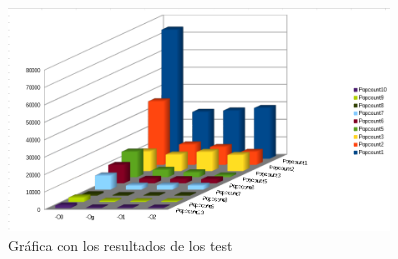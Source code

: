 	\begin{figure}[htb]
		\centering
		\includegraphics[width=0.9\textwidth]{./imagenes/3}
		\caption{Gráfica con los resultados de los test} \label{fig:33}
	\end{figure}
	

	


